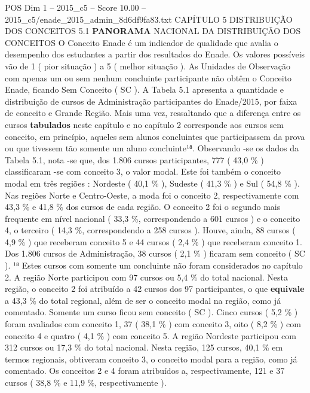 \begin{textsample}{POS Dim 1 – 2015\_c5 – Score 10.00 – 2015\_c5/enade\_2015\_admin\_8d6df9fa83.txt}  \label{ex:f1_pos_092}
CAPÍTULO 5 DISTRIBUIÇÃO DOS CONCEITOS 5.1 \textbf{PANORAMA} NACIONAL DA DISTRIBUIÇÃO DOS CONCEITOS O Conceito Enade é um indicador de qualidade que avalia o desempenho dos estudantes a partir dos resultados do Enade.
Os valores possíveis vão de 1 ( pior situação ) a 5 ( melhor situação ).
As Unidades de Observação com apenas um ou sem nenhum concluinte participante não obtêm o Conceito Enade, ficando Sem Conceito ( SC ).
A Tabela 5.1 apresenta a quantidade e distribuição de cursos de Administração participantes do Enade/2015, por faixa de conceito e Grande Região.
Mais uma vez, ressaltando que a diferença entre os cursos \textbf{tabulados} neste capítulo e no capítulo 2 corresponde aos cursos sem conceito, em princípio, aqueles sem alunos concluintes que participassem da prova ou que tivessem tão somente um aluno concluinte¹⁸.
Observando -se os dados da Tabela 5.1, nota -se que, dos 1.806 cursos participantes, 777 ( 43,0 \% ) classificaram -se com conceito 3, o valor modal.
Este foi também o conceito modal em três regiões : Nordeste ( 40,1 \% ), Sudeste ( 41,3 \% ) e Sul ( 54,8 \% ).
Nas regiões Norte e Centro-Oeste, a moda foi o conceito 2, respectivamente com 43,3 \% e 41,8 \% dos cursos de cada região.
O conceito 2 foi o segundo mais frequente em nível nacional ( 33,3 \%, correspondendo a 601 cursos ) e o conceito 4, o terceiro ( 14,3 \%, correspondendo a 258 cursos ).
Houve, ainda, 88 cursos ( 4,9 \% ) que receberam conceito 5 e 44 cursos ( 2,4 \% ) que receberam conceito 1.
Dos 1.806 cursos de Administração, 38 cursos ( 2,1 \% ) ficaram sem conceito ( SC ). ¹⁸ Estes cursos com somente um concluinte não foram considerados no capítulo 2.
A região Norte participou com 97 cursos ou 5,4 \% do total nacional.
Nesta região, o conceito 2 foi atribuído a 42 cursos dos 97 participantes, o que \textbf{equivale} a 43,3 \% do total regional, além de ser o conceito modal na região, como já comentado.
Somente um curso ficou sem conceito ( SC ).
Cinco cursos ( 5,2 \% ) foram avaliados com conceito 1, 37 ( 38,1 \% ) com conceito 3, oito ( 8,2 \% ) com conceito 4 e quatro ( 4,1 \% ) com conceito 5.
A região Nordeste participou com 312 cursos ou 17,3 \% do total nacional.
Nesta região, 125 cursos, 40,1 \% em termos regionais, obtiveram conceito 3, o conceito modal para a região, como já comentado.
Os conceitos 2 e 4 foram atribuídos a, respectivamente, 121 e 37 cursos ( 38,8 \% e 11,9 \%, respectivamente ).

\end{textsample}
